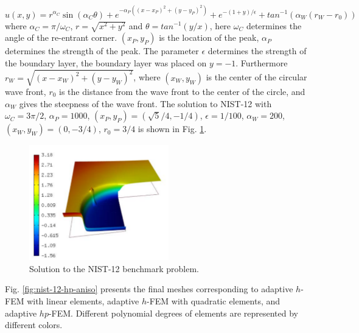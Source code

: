 \documentclass[12pt]{elsarticle}
\begin{document}
\[
u(x,y) =  r^{\alpha_{C} }\sin(\alpha_{C} \theta)
+ e^{-\alpha_{P} ((x - x_{P})^{2} + (y - y_{P})^{2})}
+ e^{-(1 + y) / \epsilon}
+ tan^{-1}(\alpha_{W} (r_{W} - r_{0}))
\]
where $\alpha_C = \pi / \omega_C$, $r = \sqrt{x^2+y^2}$
and $\theta = tan^{-1}(y/x)$, here $\omega_C$ determines
the angle of the re-entrant corner.
$(x_{P}, y_{P})$ is the location of the peak, $\alpha_{P}$
determines the strength of the peak.
The parameter $\epsilon$ determines the
strength of the boundary layer, the boundary layer was placed on $y = -1$.
Furthermore
$r_{W} = \sqrt{(x - x_{W})^{2} + (y - y_{W})^{2}}$,
where $(x_{W}, y_{W})$ is the center of the circular wave front,
$r_{0}$ is the distance from the wave front to the
center of the circle, and $\alpha_W$ gives
the steepness of the wave front.
The solution to NIST-12 with $\omega_C = 3 \pi /2$,
$\alpha_{P} = 1000$, $(x_{P}, y_{P}) = (\sqrt{5} / 4, -1/4)$,
$\epsilon = 1/100$,
$\alpha_{W} = 200$, $(x_{W}, y_{W}) = (0, -3/4)$, $r_{0} = 3/4$
is shown in Fig. \ref{fig:sln-nist12}.

\begin{figure}[H]
\centering
\includegraphics[height=5cm]{mafig71.pdf}
\caption{Solution to the NIST-12 benchmark problem.}
\label{fig:sln-nist12}
\end{figure}

Fig. \ref{fig:nist-12-hp-aniso} presents the final meshes corresponding to adaptive $h$-FEM with
linear elements, adaptive $h$-FEM with quadratic elements, and adaptive $hp$-FEM. Different
polynomial degrees of elements are represented by different colors.
\end{document}
